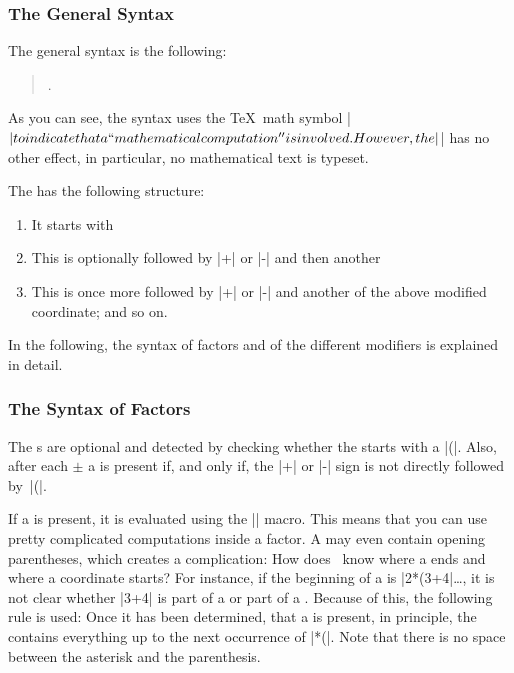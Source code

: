 \subsubsection{The General Syntax}

The general syntax is the following:

\begin{quote}
  .
\end{quote}

As you can see, the syntax uses the \TeX\ math symbol |$| to %
indicate that a ``mathematical computation'' is involved. However, the |$| %
has no other effect, in particular, no mathematical text is typeset.

The  has the following structure:
\begin{enumerate}
\item
  It starts with
  \begin{quote}
  \end{quote}
\item
  This is optionally followed by |+| or |-| and then another
  \begin{quote}
  \end{quote}
\item
  This is once more followed by |+| or |-| and another of the above
  modified coordinate; and so on.
\end{enumerate}

In the following, the syntax of factors and of the different modifiers
is explained in detail.


\subsubsection{The Syntax of Factors}

The s are optional and detected
by checking whether the  starts with a
|(|. Also, after each $\pm$ a  is present if, and only
if, the |+| or |-| sign is not directly followed by~|(|.

If a  is present, it is evaluated using the
|\pgfmathparse| macro. This means that you can use pretty complicated
computations inside a factor. A  may even contain opening
parentheses, which creates a complication: How does \tikzname\ know
where a  ends and where a coordinate starts? For
instance, if the beginning of a  is
|2*(3+4|\dots, it is not clear whether |3+4| is part of a
 or part of a . Because of this, the
following rule is used: Once it has been determined, that a
 is present, in principle, the  contains
everything up to the next occurrence of |*(|. Note that there is no
space between the asterisk and the parenthesis.

